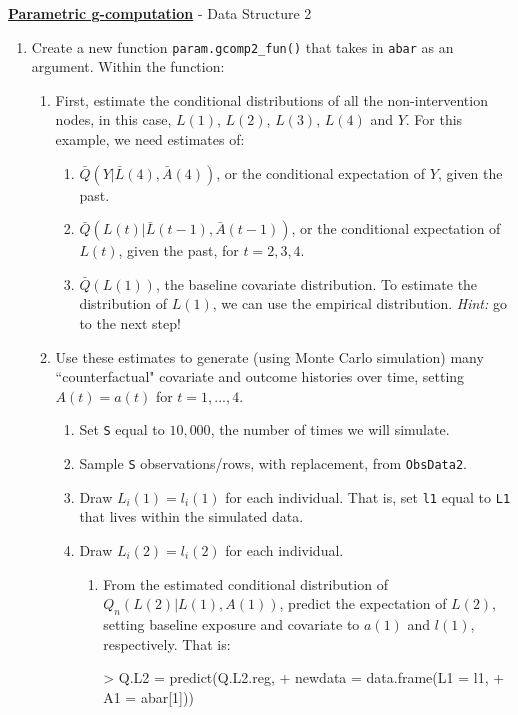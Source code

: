 \documentclass[answers]{exam}
\begin{document}
\noindent \textbf{\underline{Parametric g-computation}} - Data Structure 2
\begin{enumerate}
\item Create a new function \texttt{param.gcomp2\_fun()} that takes in \texttt{abar} as an argument. Within the function:
  \begin{enumerate}
\item First, estimate the conditional distributions of all the non-intervention nodes, in this case, $L(1)$, $L(2)$, $L(3)$, $L(4)$ and $Y$. For this example, we need estimates of:
  \begin{enumerate}
\item $\bar{Q}(Y|\bar{L}(4), \bar{A}(4))$, or the conditional expectation of $Y$, given the past. 
\item $\bar{Q}(L(t)|\bar{L}(t-1), \bar{A}(t-1))$, or the conditional expectation of $L(t)$, given the past, for $t = 2, 3, 4$.
\item $\bar{Q}(L(1))$, the baseline covariate distribution. To estimate the distribution of $L(1)$, we can use the empirical distribution. \emph{Hint:} go to the next step!
  \end{enumerate}
\item Use these estimates to generate (using Monte Carlo simulation) many ``counterfactual" covariate and outcome histories over time, setting $A(t) = a(t)$ for $t = 1,...,4$.  
\begin{enumerate}
\item Set \texttt{S} equal to $10,000$, the number of times we will simulate.
\item Sample \texttt{S} observations/rows, with replacement, from \texttt{ObsData2}.
\item Draw $L_i(1) = l_i(1)$ for each individual. That is, set \texttt{l1} equal to \texttt{L1} that lives within the simulated data.
\item Draw $L_i(2) = l_i(2)$ for each individual. 
\begin{enumerate}
\item From the estimated conditional distribution of $Q_n(L(2)| L(1), A(1))$, predict the expectation of $L(2)$, setting baseline exposure and covariate to $a(1)$ and $l(1)$, respectively. 
That is:
\begin{Schunk}
\begin{Sinput}
> Q.L2 = predict(Q.L2.reg, 
+                newdata = data.frame(L1 = l1, 
+                                     A1 = abar[1]))
\end{Sinput}

\end{Schunk}
\end{enumerate}
\end{enumerate}
\end{enumerate}
\end{enumerate}
\end{document}
